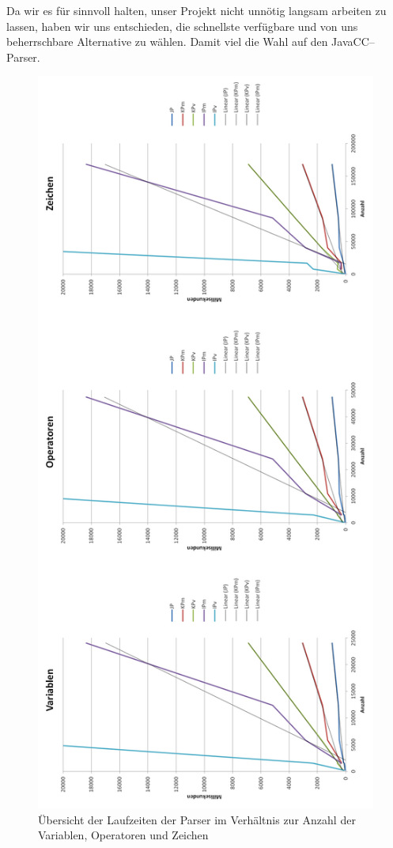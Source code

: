 \documentclass[ngerman,a4paper,abstracton,open=right,twoside=false,toc=listofnumbered,bibtotocnumbered]{scrreprt}
\begin{document}
Da wir es für sinnvoll halten, unser Projekt nicht unnötig langsam arbeiten zu lassen, haben wir uns entschieden, die schnellste verfügbare und von uns beherrschbare Alternative zu wählen. Damit viel die Wahl auf den JavaCC--Parser.

\begin{figure}[ht]
	\begin{center}
		\includegraphics[scale=0.45]{img/zeiten}
	\end{center}
	\caption{\label{parse-zeiten}Übersicht der Laufzeiten der Parser im Verhältnis zur Anzahl der Variablen, Operatoren und Zeichen}
\end{figure}
\end{document}
